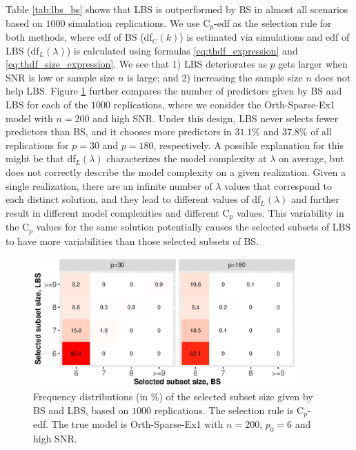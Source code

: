 Table \ref{tab:lbs_bs} shows that LBS is outperformed by BS in almost all scenarios based on $1000$ simulation replications. We use C$_p$-edf as the selection rule for both methods, where edf of BS (df$_C(k)$) is estimated via simulations and edf of LBS (df$_L(\lambda)$) is calculated using formulas \eqref{eq:thdf_expression} and \eqref{eq:thdf_size_expression}. We see that 1) LBS deteriorates as $p$ gets larger when SNR is low or sample size $n$ is large; and 2) increasing the sample size $n$ does not help LBS. Figure \ref{fig:numvar_bs_lbs} further compares the number of predictors given by BS and LBS for each of the $1000$ replications, where we consider the Orth-Sparse-Ex1 model with $n=200$ and high SNR. Under this design, LBS never selects fewer predictors than BS, and it chooses more predictors in $31.1\%$ and $37.8\%$ of all replications for $p=30$ and $p=180$, respectively. A possible explanation for this might be that df$_L(\lambda)$ characterizes the model complexity at $\lambda$ on average, but does not correctly describe the model complexity on a given realization. Given a single realization, there are an infinite number of $\lambda$ values that correspond to each distinct solution, and they lead to different values of df$_L(\lambda)$ and further result in different model complexities and different C$_p$ values. This variability in the C$_p$ values for the same solution potentially causes the selected subsets of LBS to have more variabilities than those selected subsets of BS. 





\clearpage
\begin{figure}[!ht]
	\centering
	\includegraphics[width=0.9\textwidth]{figures/numvar_bs_lbs.eps}
	\caption{Frequency distributions (in $\%$) of the selected subset size  given by BS and LBS, based on $1000$ replications. The selection rule is C$_p$-edf. The true model is Orth-Sparse-Ex1 with $n=200$, $p_0=6$ and high SNR.}
	\label{fig:numvar_bs_lbs} 
\end{figure}

